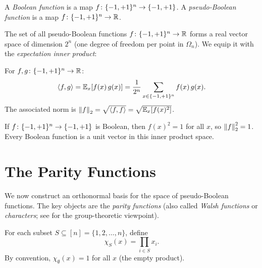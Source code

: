 \begin{definition}\label{def:boolean-fn}
A \emph{Boolean function} is a map $f \colon \{-1,+1\}^n \to \{-1,+1\}$.
A \emph{pseudo-Boolean function} is a map $f \colon \{-1,+1\}^n \to \mathbb{R}$.
\end{definition}

The set of all pseudo-Boolean functions $f \colon \{-1,+1\}^n \to \mathbb{R}$ forms
a real vector space of dimension $2^n$ (one degree of freedom per point
in $\Omega_n$). We equip it with the \emph{expectation inner product}:

\begin{definition}\label{def:fn-inner-product}
For $f, g \colon \{-1,+1\}^n \to \mathbb{R}$:
\begin{equation}\label{eq:fn-ip}
  \langle f, g \rangle = \mathbb{E}_x[f(x)\, g(x)]
  = \frac{1}{2^n} \sum_{x \in \{-1,+1\}^n} f(x)\, g(x).
\end{equation}
The associated norm is $\left\| f \right\|_2 = \sqrt{\langle f, f \rangle}
= \sqrt{\mathbb{E}_x[f(x)^2]}$.
\end{definition}

\begin{example}\label{ex:boolean-norm}
If $f \colon \{-1,+1\}^n \to \{-1,+1\}$ is Boolean, then $f(x)^2 = 1$ for all
$x$, so $\left\| f \right\|_2^2 = 1$. Every Boolean function is a unit vector in
this inner product space.
\end{example}


\section{The Parity Functions}\label{sec:parity}

We now construct an orthonormal basis for the space of pseudo-Boolean
functions. The key objects are the \emph{parity functions} (also called
\emph{Walsh functions} \citep{walsh1923closed} or \emph{characters};
see  for the group-theoretic viewpoint).

\begin{definition}\label{def:parity}
For each subset $S \subseteq [n] = \{1, 2, \ldots, n\}$, define
\begin{equation}\label{eq:chi-def}
  \chi_S(x) = \prod_{i \in S} x_i.
\end{equation}
By convention, $\chi_\emptyset(x) = 1$ for all $x$ (the empty product).
\end{definition}

